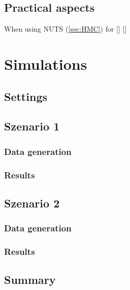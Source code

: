 \documentclass[12pt,letterpaper]{article}
\numberwithin{equation}{subsection}
\begin{document}
\subsection{Practical aspects}
\label{sec:pract}
When using NUTS (\ref{sec:HMC}) for 
[\cite{reparam}]
[\cite{paramprob}]
\pagebreak

\section{Simulations}
\label{sec:sim}
\subsection{Settings}

\subsection{Szenario 1}
\subsubsection{Data generation}
\subsubsection{Results}
\subsection{Szenario 2}
\subsubsection{Data generation}
\subsubsection{Results}

\subsection{Summary}
\pagebreak

\end{document}
